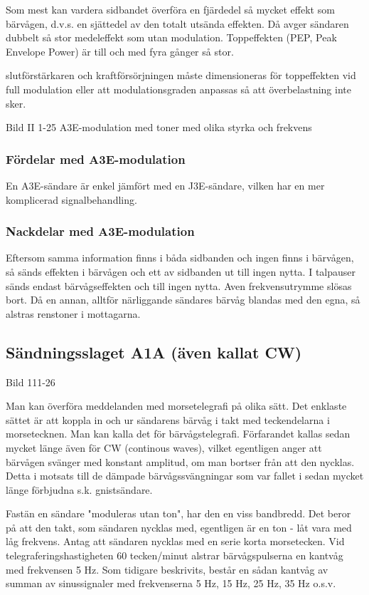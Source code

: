 Som mest kan vardera sidbandet överföra en fjärdedel så mycket effekt som bärvågen, d.v.s.
en sjättedel av den totalt utsända effekten. Då avger sändaren dubbelt så stor medeleffekt
som utan modulation. Toppeffekten (PEP, Peak Envelope Power) är till och med fyra gånger
så stor.

slutförstärkaren och kraftförsörjningen måste dimensioneras för toppeffekten vid
full modulation eller att modulationsgraden anpassas så att överbelastning inte sker.

Bild II 1-25 A3E-modulation med toner med olika styrka och frekvens

\subsubsection{Fördelar med A3E-modulation}

En A3E-sändare är enkel jämfört med en J3E-sändare, vilken har en mer komplicerad
signalbehandling.

\subsubsection{Nackdelar med A3E-modulation}

Eftersom samma information finns i båda sidbanden och ingen finns i bärvågen, så sänds
effekten i bärvågen och ett av sidbanden ut till ingen nytta. I talpauser sänds endast
bärvågseffekten och till ingen nytta. Aven frekvensutrymme slösas bort. Då en annan,
alltför närliggande sändares bärvåg blandas med den egna, så alstras renstoner i
mottagarna.

\subsection{Sändningsslaget A1A (även kallat CW)}

Bild 111-26

Man kan överföra meddelanden med morsetelegrafi på olika sätt. Det enklaste sättet är att
koppla in och ur sändarens bärvåg i takt med teckendelarna i morsetecknen. Man kan kalla
det för bärvågstelegrafi. Förfarandet kallas sedan mycket länge även för CW (continous
waves), vilket egentligen anger att bärvågen svänger med konstant amplitud, om man bortser
från att den nycklas. Detta i motsats till de dämpade bärvågssvängningar som var fallet i
sedan mycket länge förbjudna s.k. gnistsändare.

Fastän en sändare "moduleras utan ton", har den en viss bandbredd. Det beror på att den
takt, som sändaren nycklas med, egentligen är en ton - låt vara med låg frekvens. Antag
att sändaren nycklas med en serie korta morsetecken. Vid telegraferingshastigheten
60 tecken/minut alstrar bärvågspulserna en kantvåg med frekvensen 5 Hz. Som tidigare
beskrivits, består en sådan kantvåg av summan av sinussignaler med frekvenserna 5 Hz,
15 Hz, 25 Hz, 35 Hz o.s.v.

